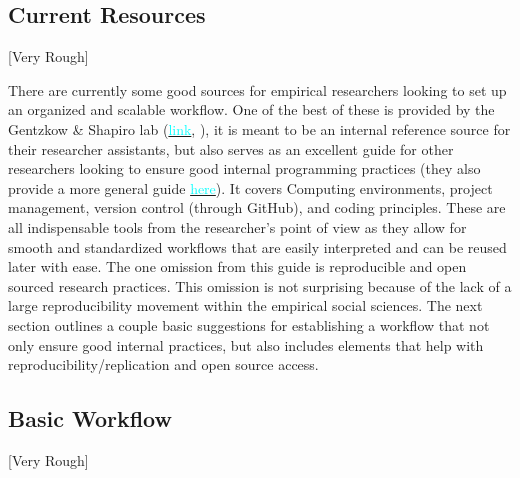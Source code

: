 \documentclass[12pt]{article}
\begin{document}
\subsection{Current Resources}
\textcolor{BrickRed}{[Very Rough]}

There are currently some good sources for empirical researchers looking to set up an organized and scalable workflow. One of the best of these is provided by the Gentzkow \& Shapiro lab (\href{https://github.com/gslab-econ/ra-manual/wiki/Getting-Started}{\textcolor{cyan}{link}}, \cite{GSlab}), it is meant to be an internal reference source for their researcher assistants, but also serves as an excellent guide for other researchers looking to ensure good internal programming practices (they also provide a more general guide \href{https://web.stanford.edu/~gentzkow/research/CodeAndData.xhtml#magicparlabel-20}{\textcolor{cyan}{here}}). It covers Computing environments, project management, version control (through GitHub), and coding principles. These are all indispensable tools from the researcher's point of view as they allow for smooth and standardized workflows that are easily interpreted and can be reused later with ease. The one omission from this guide is reproducible and open sourced research practices. This omission is not surprising because of the lack of a large reproducibility movement within the empirical social sciences. The next section outlines a couple basic suggestions for establishing a workflow that not only ensure good internal practices, but also includes elements that help with reproducibility/replication and open source access.

\subsection{Basic Workflow}
\textcolor{BrickRed}{[Very Rough]}
\end{document}
